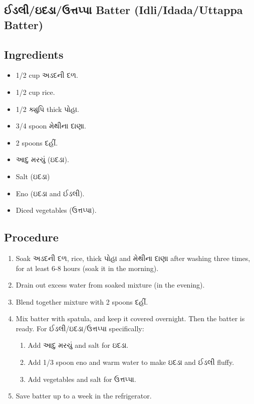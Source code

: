 \documentclass[../../recipes.tex]{subfiles}
\begin{document}
\begin{gujarati}

\chapter{ઈડલી/ઇદડા/ઉત્તપ્પા Batter (Idli/Idada/Uttappa Batter)}

\section*{Ingredients}

\begin{itemize}
    \item 1/2 cup અડદની દળ.
    \item 1/2 cup rice.
    \item 1/2 ક્યુપિ thick પોહા.
    \item 3/4 spoon મેથીના દાણા.
    \item 2 spoons દહીં.
    \item આદુ મરચું (ઇદડા).
    \item Salt (ઇદડા)
    \item Eno (ઇદડા and ઈડલી).
    \item Diced vegetables (ઉત્તપ્પા).
\end{itemize}

\noindent
\section*{Procedure}

\begin{enumerate}
    \item Soak અડદની દળ, rice, thick પોહા and મેથીના દાણા after washing three times, for at least 6-8 hours (soak it in the morning).
    \item Drain out excess water from soaked mixture (in the evening).
    \item Blend together mixture with 2 spoons દહીં.
    \item Mix batter with spatula, and keep it covered overnight. Then the batter is ready. For ઈડલી/ઇદડા/ઉત્તપ્પા specifically:
    \begin{enumerate}
        \item Add આદુ મરચું and salt for ઇદડા.
        \item Add 1/3 spoon eno and warm water to make ઇદડા and ઈડલી fluffy.
        \item Add vegetables and salt for ઉત્તપ્પા.
    \end{enumerate}
    \item Save batter up to a week in the refrigerator.
\end{enumerate}

\end{gujarati}
\end{document}
